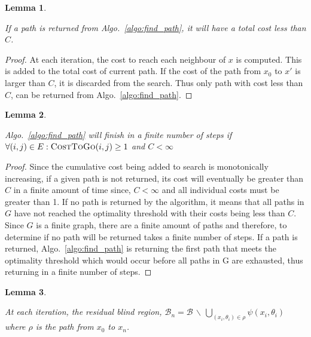 \documentclass[letterpaper, 10pt, conference]{ieeeconf}
\newcommand{\Function}[1]{\ensuremath{{\textsc{#1}}}}
\newcommand{\B}[0]{\ensuremath{{{\mathcal{B}}}}}
\newtheorem{lemma}{Lemma}
\begin{document}
\begin{lemma}

    \label{lemma:cost}

    If a path is returned from Algo.~\ref{algo:find_path}, it will have a total
    cost less than $C$.

\end{lemma}

\begin{proof}

    At each iteration, the cost to reach each neighbour of $x$ is computed.
    This is added to the total cost of current path. If the cost of the path
    from $x_0$ to $x'$ is larger than $C$, it is discarded from the search.
    Thus only path with cost less than $C$, can be returned from
    Algo.~\ref{algo:find_path}.

\end{proof}

\begin{lemma}
    
    \label{lemma:finite}

    Algo.~\ref{algo:find_path} will finish in a finite number of steps if
    $\forall (i, j) \in E: \Function{CostToGo}(i, j) \geq 1$ and $C < \infty$

\end{lemma}

\begin{proof}

    Since the cumulative cost being added to search is monotonically
    increasing, if a given path is not returned, its cost will eventually be
    greater than $C$ in a finite amount of time since, $C <
    \infty$ and all individual costs must be greater than 1. If no path is
    returned by the algorithm, it means that all paths in $G$ have not reached
    the optimality threshold with their costs being less than $C$. Since $G$ is
    a finite graph, there are a finite amount of paths and therefore, to
    determine if no path will be returned takes a finite number of steps. If a
    path is returned, Algo.~\ref{algo:find_path} is returning the first path
    that meets the optimality threshold which would occur before all paths in G
    are exhausted, thus returning in a finite number of steps.

\end{proof}

\begin{lemma}

    \label{lemma:res_area}

    At each iteration, the residual blind region, $\B_n = \B \, \backslash \,
    \bigcup\limits_{(x_i, \theta_i) \in \rho} \psi(x_i, \theta_i)$ where $\rho$
    is the path from $x_0$ to $x_n$.

\end{lemma}
\end{document}
